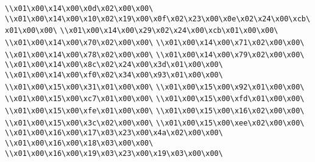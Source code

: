 \verb|\\x01\x00\x14\x00\x0d\x02\x00\x00\|\newline
\verb|\\x01\x00\x14\x00\x10\x02\x19\x00\x0f\x02\x23\x00\x0e\x02\x24\x00\xcb\x01\x00\x00\|\newline
\verb|\\x01\x00\x14\x00\x29\x02\x24\x00\xcb\x01\x00\x00\|\newline
\verb|\\x01\x00\x14\x00\x70\x02\x00\x00\|\newline
\verb|\\x01\x00\x14\x00\x71\x02\x00\x00\|\newline
\verb|\\x01\x00\x14\x00\x78\x02\x00\x00\|\newline
\verb|\\x01\x00\x14\x00\x79\x02\x00\x00\|\newline
\verb|\\x01\x00\x14\x00\x8c\x02\x24\x00\x3d\x01\x00\x00\|\newline
\verb|\\x01\x00\x14\x00\xf0\x02\x34\x00\x93\x01\x00\x00\|\newline
\verb|\\x01\x00\x15\x00\x31\x01\x00\x00\|\newline
\verb|\\x01\x00\x15\x00\x92\x01\x00\x00\|\newline
\verb|\\x01\x00\x15\x00\xc7\x01\x00\x00\|\newline
\verb|\\x01\x00\x15\x00\xfd\x01\x00\x00\|\newline
\verb|\\x01\x00\x15\x00\xfe\x01\x00\x00\|\newline
\verb|\\x01\x00\x15\x00\x16\x02\x00\x00\|\newline
\verb|\\x01\x00\x15\x00\x3c\x02\x00\x00\|\newline
\verb|\\x01\x00\x15\x00\xee\x02\x00\x00\|\newline
\verb|\\x01\x00\x16\x00\x17\x03\x23\x00\x4a\x02\x00\x00\|\newline
\verb|\\x01\x00\x16\x00\x18\x03\x00\x00\|\newline
\verb|\\x01\x00\x16\x00\x19\x03\x23\x00\x19\x03\x00\x00\|\newline
